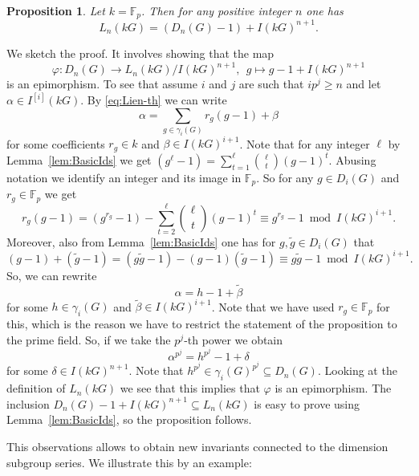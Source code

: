 \documentclass[11pt, a4paper]{amsart}
\newtheorem{proposition}[theorem]{Proposition}
\theoremstyle{definition}
\begin{document}
\begin{proposition}\label{prop:Ps72} \cite{PassiSehgal72}
Let $k = \mathbb{F}_p$. Then for any positive integer $n$ one has
\[L_n(kG) = (D_n(G) - 1) + I(kG)^{n+1}. \]
\end{proposition}

We sketch the proof. It involves showing that the map
\[\varphi: D_n(G) \rightarrow L_n(kG)/I(kG)^{n+1}, \ \ g \mapsto g-1 + I(kG)^{n+1} \]
is an epimorphism. To see that assume $i$ and $j$ are such that $ip^j \geq n$ and let $\alpha \in I^{[i]}(kG)$. By \eqref{eq:Lien-th} we can write
\[ \alpha = \sum_{g \in \gamma_i(G)} r_g(g-1) + \beta \]
for some coefficients $r_g \in k$ and $\beta \in I(kG)^{i+1}$. Note that for any integer $\ell$ by Lemma~\ref{lem:BasicIds} we get $(g^\ell-1) = \sum_{t=1}^{\ell} \binom{\ell}{t} (g-1)^t$. Abusing notation we identify an integer and its image in $\mathbb{F}_p$. So for any $g \in D_i(G)$ and $r_g \in \mathbb{F}_p$ we get 
\[r_g (g-1) = (g^{r_g}-1) - \sum_{t=2}^\ell \binom{\ell}{t} (g-1)^t \equiv g^{r_g}-1 \bmod I(kG)^{i+1}. \]
Moreover, also from Lemma~\ref{lem:BasicIds} one has for $g, \tilde{g} \in D_i(G)$ that
\[(g-1) + (\tilde{g}-1) = (g\tilde{g}-1) - (g-1)(\tilde{g}-1) \equiv g\tilde{g}-1 \bmod I(kG)^{i+1}. \]
So, we can rewrite 
\[\alpha = h-1 + \tilde{\beta} \]
for some $h \in \gamma_i(G)$ and $\tilde{\beta} \in I(kG)^{i+1}$. Note that we have used $r_g \in \mathbb{F}_p$ for this, which is the reason we have to restrict the statement of the proposition to the prime field. So, if we take the $p^j$-th power we obtain
\[\alpha^{p^j} = h^{p^j}-1 + \delta \]
for some $\delta \in I(kG)^{n+1}$. Note that $h^{p^j} \in \gamma_i(G)^{p^j} \subseteq D_n(G)$. Looking at the definition of $L_n(kG)$ we see that this implies that $\varphi$ is an epimorphism. The inclusion $D_n(G)-1 + I(kG)^{n+1} \subseteq L_n(kG)$ is easy to prove using Lemma~\ref{lem:BasicIds}, so the proposition follows.

This observations allows to obtain new invariants connected to the dimension subgroup series. We illustrate this by an example:
\end{document}
